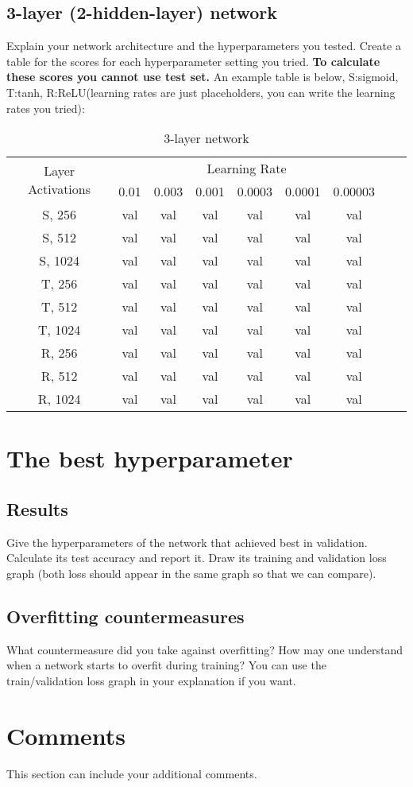 \documentclass{article}
\begin{document}
\subsection{3-layer (2-hidden-layer) network}
Explain your network architecture and the hyperparameters you tested. Create a table for the scores for each hyperparameter setting you tried. \textbf{To calculate these scores you cannot use test set.} An example table is below, S:sigmoid, T:tanh, R:ReLU(learning rates are just placeholders, you can write the learning rates you tried):\\
\begin{table}[htbp]
    \centering
    \begin{tabular}{|c|c|c|c|c|c|c|c|c|}
    \hline
    \multirow{2}{5em}{Layer Activations} & \multicolumn{6}{c|}{Learning Rate} \\
        & 0.01 & 0.003 & 0.001 & 0.0003 & 0.0001 & 0.00003 \\
        \hline \hline
        S, 256  & val & val & val & val & val & val \\
        S, 512  & val & val & val & val & val & val \\
        S, 1024  & val & val & val & val & val & val \\
        T, 256  & val & val & val & val & val & val \\
        T, 512  & val & val & val & val & val & val \\
        T, 1024  & val & val & val & val & val & val \\
        R, 256  & val & val & val & val & val & val \\
        R, 512  & val & val & val & val & val & val \\
        R, 1024  & val & val & val & val & val & val \\
        \hline
    \end{tabular}
    \caption{3-layer network}
    \label{tab:3layer}
\end{table}

\section{The best hyperparameter}
\subsection{Results}
Give the hyperparameters of the network that achieved best in validation. Calculate its test accuracy and report it. Draw its training and validation loss graph (both loss should appear in the same graph so that we can compare).

\subsection{Overfitting countermeasures}
What countermeasure did you take against overfitting? How may one understand when a network starts to overfit during training? You can use the train/validation loss graph in your explanation if you want.


\section{Comments}
This section can include your additional comments.
\end{document}

